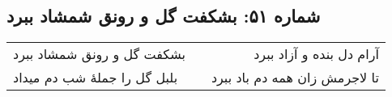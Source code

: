 \begin{center}
\section*{شماره ۵۱: بشکفت گل و رونق شمشاد ببرد}
\label{sec:051}
\begin{longtable}{l p{0.5cm} r}
بشکفت گل و رونق شمشاد ببرد
&&
آرام دل بنده و آزاد ببرد
\\
بلبل گل را جملهٔ شب دم میداد
&&
تا لاجرمش زان همه دم باد ببرد
\\
\end{longtable}
\end{center}
